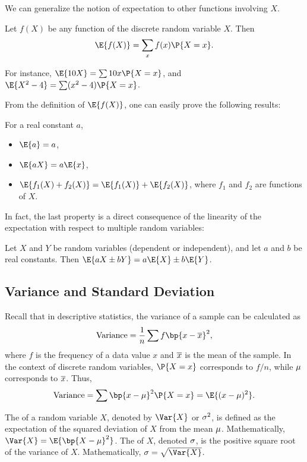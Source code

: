 We can generalize the notion of expectation to other functions involving $X$.

\begin{definition}
    Let $f(X)$ be any function of the discrete random variable $X$. Then \[\E{f(X)} = \sum_{x} f(x) \P{X = x}.\]
\end{definition}

For instance, $\E{10 X} = \sum 10 x \P{X = x}$, and $\E{X^2 - 4} = \sum (x^2 - 4) \P{X = x}$.

From the definition of $\E{f(X)}$, one can easily prove the following results:
\begin{proposition}
    For a real constant $a$,
    \begin{itemize}
        \item $\E{a} = a$,
        \item $\E{aX} = a\E{x}$,
        \item $\E{f_1(X) + f_2(X)} = \E{f_1(X)} + \E{f_2(X)}$, where $f_1$ and $f_2$ are functions of $X$.
    \end{itemize}
\end{proposition}

In fact, the last property is a direct consequence of the linearity of the expectation with respect to multiple random variables:

\begin{proposition}
    Let $X$ and $Y$ be random variables (dependent or independent), and let $a$ and $b$ be real constants. Then $\E{aX \pm bY} = a\E{X} \pm b\E{Y}$.
\end{proposition}

\subsection{Variance and Standard Deviation}\label{ssec:DRV-Var}

Recall that in descriptive statistics, the variance of a sample can be calculated as \[\text{Variance} = \frac1n \sum f\bp{x - \ol x}^2,\] where $f$ is the frequency of a data value $x$ and $\overline{x}$ is the mean of the sample. In the context of discrete random variables, $\P{X = x}$ corresponds to $f/n$, while $\mu$ corresponds to $\overline{x}$. Thus, \[\text{Variance} = \sum \bp{x - \m}^2 \P{X = x} = \E{(x- \m)^2}.\]

\begin{definition}
    The  of a random variable $X$, denoted by $\Var{X}$ or $\sigma^2$, is defined as the expectation of the squared deviation of $X$ from the mean $\mu$. Mathematically, $\Var{X} = \E{\bp{X - \m}^2}$. The  of $X$, denoted $\sigma$, is the positive square root of the variance of $X$. Mathematically, $\s = \sqrt{\Var{X}}$.
\end{definition}

